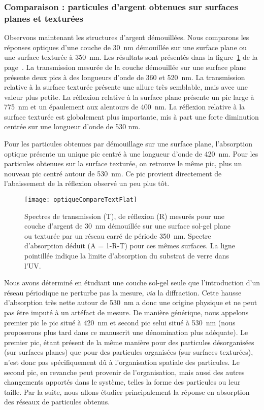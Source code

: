 	\subsubsection{Comparaison : particules d'argent obtenues sur surfaces planes et texturées}
Observons maintenant les structures d’argent démouillées. Nous comparons les réponses optiques d’une couche de 30~nm démouillée sur une surface plane ou une surface texturée à 350~nm. Les résultats sont présentés dans la figure~\ref{optiqueCompareTextFlat} de la page~\pageref{optiqueCompareTextFlat}. La transmission mesurée de la couche démouillée sur une surface plane présente deux pics à des longueurs d'onde de 360 et 520~nm. La transmission relative à la surface texturée présente une allure très semblable, mais avec une valeur plus petite. La réflexion relative à la surface plane présente un pic large à 775~nm et un épaulement aux alentours de 400~nm. La réflexion relative à la surface texturée est globalement plus importante, mis à part une forte diminution centrée sur une longueur d'onde de 530 nm.\par 
Pour les particules obtenues par démouillage sur une surface plane, l'absorption optique présente un unique pic centré à une longueur d'onde de 420~nm. Pour les particules obtenues sur la surface texturée, on retrouve le même pic, plus un nouveau pic centré autour de 530~nm. Ce pic provient directement de l'abaissement de la réflexion observé un peu plus tôt.\par 

\begin{figure}[!p]
\centering
\texttt{[image: optiqueCompareTextFlat]}
\caption{Spectres de transmission (T), de réflexion (R) mesurés pour une couche d’argent de 30~nm démouillée sur une surface sol-gel plane ou texturée par un réseau carré de période 350~nm. Spectre d’absorption déduit (A = 1-R-T) pour ces mêmes surfaces. La ligne pointillée indique la limite d’absorption du substrat de verre dans l’UV.}
\label{optiqueCompareTextFlat}
\end{figure}
Nous avons déterminé en étudiant une couche sol-gel seule que l'introduction d'un réseau périodique ne perturbe pas la mesure, \textit{via} la diffraction. Cette hausse d'absorption très nette autour de 530~nm a donc une origine physique et ne peut pas être imputé à un artéfact de mesure. De manière générique, nous appelons \og premier pic \fg{} le pic situé à 420~nm et \og second pic \fg{} selui situé à 530~nm (nous proposerons plus tard dans ce manuscrit une dénomination plus adéquate). Le premier pic, étant présent de la même manière pour des particules désorganisées (sur surfaces planes) que pour des particules organisées (sur surfaces texturées), n'est donc pas spécifiquement dû à l'organisation spatiale des particules. Le second pic, en revanche peut provenir de l'organisation, mais aussi des autres changements apportés dans le système, telles la forme des particules ou leur taille. Par la suite, nous allons étudier principalement la réponse en absorption des réseaux de particules obtenus. \par 
   
